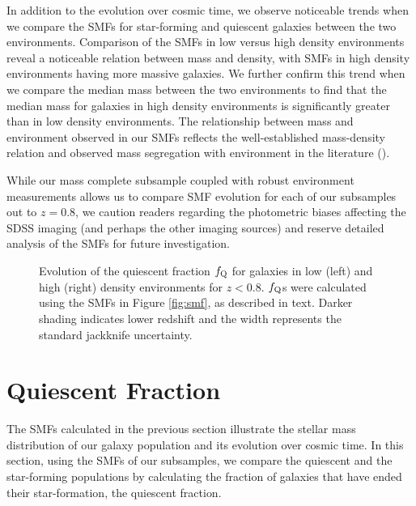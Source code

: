 \documentclass{emulateapj}
\begin{document}
In addition to the evolution over cosmic time, we observe noticeable
trends when we compare the SMFs for star-forming and quiescent
galaxies between the two environments. Comparison of the SMFs in low
versus high density environments reveal a noticeable relation between
mass and density, with SMFs in high density environments having more
massive galaxies. We further confirm this trend when we compare the
median mass between the two environments to find that the median mass
for galaxies in high density environments is significantly greater
than in low density environments. The relationship between mass and
environment observed in our SMFs reflects the well-established
mass-density relation and observed mass segregation with environment
in the literature (\citealt{norberg02a, zehavi02a, Blanton:2005ab,
  bundy06a, Scodeggio:2009aa, Bolzonella:2010aa}).

While our mass complete subsample coupled with robust environment
measurements allows us to compare SMF evolution for each of our
subsamples out to $z=0.8$, we caution readers regarding the
photometric biases affecting the SDSS imaging (and perhaps the other
imaging sources) and reserve detailed analysis of the SMFs for 
future investigation.

\begin{figure*}
    \begin{center}
        \leavevmode
        \caption{Evolution of the quiescent fraction $f_{\rm{Q}}$ for
          galaxies in low (left) and high (right) density
          environments for $z < 0.8$. $f_{\rm{Q}}$s were calculated
          using the SMFs in Figure \ref{fig:smf}, as described in text. Darker shading indicates lower redshift and the width represents the standard jackknife uncertainty.}         \label{fig:qf}
    \end{center}
\end{figure*}
\section{Quiescent Fraction} \label{sec:qf_const}
The SMFs calculated in the previous section illustrate the stellar
mass distribution of our galaxy population and its evolution over
cosmic time. In this section, using the SMFs of our subsamples, we
compare the quiescent and the star-forming populations by calculating
the fraction of galaxies that have ended their star-formation, the quiescent fraction. 
\end{document}
